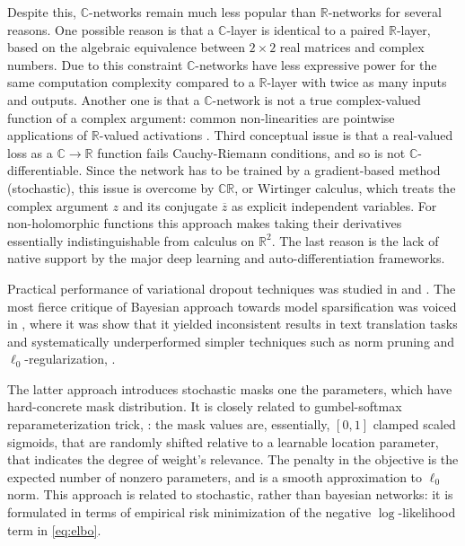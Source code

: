 \documentclass[a4paper,10pt]{article}
\newcommand{\real}{\mathbb{R}}
\newcommand{\cplx}{\mathbb{C}}
\newcommand{\conj}[1]{\overline{#1}}
\begin{document}
Despite this, $\cplx$-networks remain much less popular than $\real$-networks for several
reasons. One possible reason is that a $\cplx$-layer is identical to a paired $\real$-layer,
based on the algebraic equivalence between $2 \times 2$ real matrices and complex numbers.
Due to this constraint $\cplx$-networks have less expressive power for the same computation
complexity compared to a $\real$-layer with twice as many inputs and outputs.
%
Another one is that a $\cplx$-network is not a true complex-valued function of a complex
argument: common non-linearities are pointwise applications of $\real$-valued activations
\cite{trabelsi_deep_2017}.
%
Third conceptual issue is that a real-valued loss as a $\cplx\to\real$ function fails
Cauchy-Riemann conditions, and so is not $\cplx$-differentiable. Since the network has to
be trained by a gradient-based method (stochastic), this issue is overcome by $\cplx\real$,
or Wirtinger calculus, which treats the complex argument $z$ and its conjugate $\conj{z}$
as explicit independent variables. For non-holomorphic functions this approach makes taking
their derivatives essentially indistinguishable from calculus on $\real^2$.
%
The last reason is the lack of native support by the major deep learning and auto-differentiation
frameworks.

Practical performance of variational dropout techniques was studied in \cite{citation_needed}
and \cite{citation_needed}. The most fierce critique of Bayesian approach towards model
sparsification was voiced in \cite{gale_state_2019}, where it was show that it yielded
inconsistent results in text translation tasks and systematically underperformed simpler
techniques such as norm pruning and $\ell_0$-regularization, \cite{louizos_learning_2017}.

The latter approach introduces stochastic masks one the parameters, which have hard-concrete
mask distribution. It is closely related to gumbel-softmax reparameterization trick,
\cite{kingma_auto-encoding_2014,jang_categorical_2017}: the mask values are, essentially,
$[0,1]$ clamped scaled sigmoids, that are randomly shifted relative to a learnable location
parameter, that indicates the degree of weight's relevance. The penalty in the objective is
the expected number of nonzero parameters, and is a smooth approximation to $\ell_0$ norm.
This approach is related to stochastic, rather than bayesian networks: it is formulated in
terms of empirical risk minimization of the negative $\log$-likelihood term in \eqref{eq:elbo}.
\end{document}
